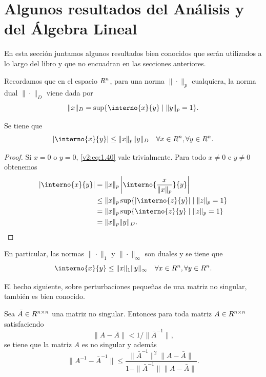
\section{Algunos resultados del Análisis y del Álgebra Lineal}\label{v2:sec:1.5}

En esta sección juntamos algunos resultados bien conocidos que serán utilizados a lo largo del libro y que no encuadran en las secciones anteriores.

Recordamos que en el espacio $R^n$, para una norma $\|\cdot\|_p$ cualquiera, la norma dual $\|\cdot\|_D$ viene dada por
\[
    \|x\|_D = \sup \{ \interno{x}{y} \mid \|y\|_p = 1 \}.
\]

\begin{lemma}\label{v2:lem:1.5.1}
    Se tiene que
    \begin{equation}
        |\interno{x}{y}| \le \|x\|_p \|y\|_D \quad \forall x \in \Rn, \forall y \in \Rn.
        \label{v2:eq:1.40}
    \end{equation}
\end{lemma}

\begin{proof}
    Si $x = 0$ o $y = 0$, \eqref{v2:eq:1.40} vale trivialmente. Para todo $x \neq 0$ e $y \neq 0$ obtenemos
    \begin{align*}
        |\interno{x}{y}| &= \|x\|_p \left|\interno{\frac{x}{\|x\|_p}}{y}\right| \\
        &\le \|x\|_p \sup \{ |\interno{z}{y}| \mid \|z\|_p = 1 \} \\
        &= \|x\|_p \sup \{ \interno{z}{y} \mid \|z\|_p = 1 \} \\
        &= \|x\|_p \|y\|_D. \qedhere
    \end{align*}
\end{proof}

En particular, las normas $\|\cdot\|_1$ y $\|\cdot\|_\infty$ son duales y se tiene que
\[
    \interno{x}{y} \le \|x\|_1 \|y\|_\infty \quad \forall x \in \Rn, \forall y \in \Rn.
\]

El hecho siguiente, sobre perturbaciones pequeñas de una matriz no singular, también es bien conocido.

\begin{theorem}\label{v2:thm:1.5.1}
    Sea $\bar{A} \in R^{n \times n}$ una matriz no singular. Entonces para toda matriz $A \in R^{n \times n}$ satisfaciendo
    \[
        \|A - \bar{A}\| < 1/\|\bar{A}^{-1}\|,
    \]
    se tiene que la matriz $A$ es no singular y además
    \[
        \|A^{-1} - \bar{A}^{-1}\| \le \frac{\|\bar{A}^{-1}\|^2 \|A - \bar{A}\|}{1 - \|\bar{A}^{-1}\| \|A - \bar{A}\|}.
    \]
\end{theorem}

